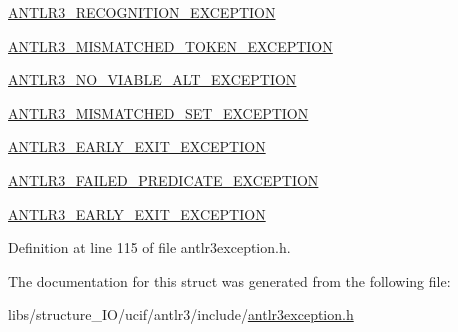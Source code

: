 \begin{DoxyItemize}
\item \hyperlink{antlr3exception_8h_ac7143b1162dc22a4a7ec575162fc7517}{A\-N\-T\-L\-R3\-\_\-\-R\-E\-C\-O\-G\-N\-I\-T\-I\-O\-N\-\_\-\-E\-X\-C\-E\-P\-T\-I\-O\-N}
\item \hyperlink{antlr3exception_8h_ac32454c4a137e8d3ffbf90b878815163}{A\-N\-T\-L\-R3\-\_\-\-M\-I\-S\-M\-A\-T\-C\-H\-E\-D\-\_\-\-T\-O\-K\-E\-N\-\_\-\-E\-X\-C\-E\-P\-T\-I\-O\-N}
\item \hyperlink{antlr3exception_8h_af9f9a16af9cbc9902e368b3e6f0e21f4}{A\-N\-T\-L\-R3\-\_\-\-N\-O\-\_\-\-V\-I\-A\-B\-L\-E\-\_\-\-A\-L\-T\-\_\-\-E\-X\-C\-E\-P\-T\-I\-O\-N}
\item \hyperlink{antlr3exception_8h_a59cb959aa2810663052cfa3b288786d0}{A\-N\-T\-L\-R3\-\_\-\-M\-I\-S\-M\-A\-T\-C\-H\-E\-D\-\_\-\-S\-E\-T\-\_\-\-E\-X\-C\-E\-P\-T\-I\-O\-N}
\item \hyperlink{antlr3exception_8h_a7f2535f0ce072168ba1a6ea013d83d89}{A\-N\-T\-L\-R3\-\_\-\-E\-A\-R\-L\-Y\-\_\-\-E\-X\-I\-T\-\_\-\-E\-X\-C\-E\-P\-T\-I\-O\-N}
\item \hyperlink{antlr3exception_8h_a92a3fa05bcc0ff1298c20728f4b2b5a1}{A\-N\-T\-L\-R3\-\_\-\-F\-A\-I\-L\-E\-D\-\_\-\-P\-R\-E\-D\-I\-C\-A\-T\-E\-\_\-\-E\-X\-C\-E\-P\-T\-I\-O\-N}
\item \hyperlink{antlr3exception_8h_a7f2535f0ce072168ba1a6ea013d83d89}{A\-N\-T\-L\-R3\-\_\-\-E\-A\-R\-L\-Y\-\_\-\-E\-X\-I\-T\-\_\-\-E\-X\-C\-E\-P\-T\-I\-O\-N} 
\end{DoxyItemize}

Definition at line 115 of file antlr3exception.\-h.



The documentation for this struct was generated from the following file\-:\begin{DoxyCompactItemize}
\item 
libs/structure\-\_\-\-I\-O/ucif/antlr3/include/\hyperlink{antlr3exception_8h}{antlr3exception.\-h}\end{DoxyCompactItemize}
